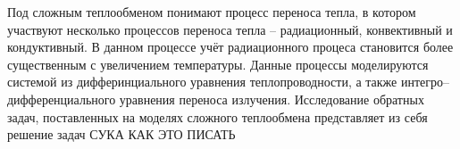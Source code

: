 \documentclass[11pt]{article}
\begin{document}
    Под сложным теплообменом понимают процесс переноса тепла, в котором участвуют
    несколько процессов переноса тепла -- радиационный, конвективный и кондуктивный.
    В данном процессе учёт радиационного процеса становится более существенным с
    увеличением температуры.
    Данные процессы моделируются системой из дифферинциального уравнения теплопроводности,
    а также интегро--дифференциального уравнения переноса излучения.
    Исследование обратных задач, поставленных на моделях сложного теплообмена представляет из себя
    решение задач СУКА КАК ЭТО ПИСАТЬ
\end{document}
